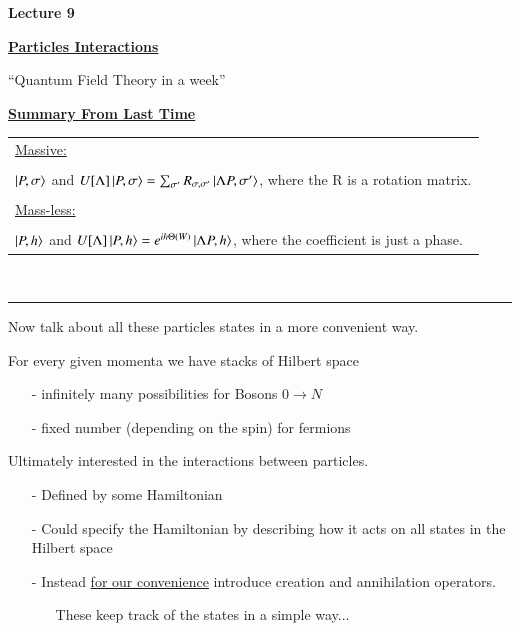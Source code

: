 




\thispagestyle{fancy}

\begin{center}
{\huge \textbf{Lecture 9}}
\end{center}

{\fontsize{14}{16}\selectfont

\textbf{\underline{Particles Interactions}} 

``Quantum Field Theory in a week''

{\Large \underline{\textbf{Summary From Last Time}}}

\begin{tabular}{l}
\underline{Massive:}\\
\\
\hspace{0.5in}$\ket{P, \sigma}$ and $U[\Lambda] \ket{P, \sigma} = \sum_{\sigma'} R_{\sigma,\sigma'} \ket{\Lambda P, \sigma'}$, where the R is a rotation matrix.\\
\\
\underline{Mass-less:}\\
\\
\hspace{0.5in}$\ket{P, h}$ and $U[\Lambda] \ket{P, h} = e^{ih\Theta(W)}\ket{\Lambda P, h}$, where the coefficient is just a phase.\\
\end{tabular}\\

\noindent\rule{\textwidth}{1pt}
Now talk about all these particles states in a more convenient way.  

For every given momenta we have stacks of Hilbert space
\begin{itemize}
\item[-] infinitely many possibilities for Bosons $0\rightarrow N$
\item[-] fixed number (depending on the spin) for fermions
\end{itemize}

\vspace{0.5in}
Ultimately interested in the interactions between particles. 
\begin{itemize}
\item[-] Defined by some Hamiltonian        
\item[-] Could specify the Hamiltonian by describing how it acts on all states in the Hilbert space
\item[-] Instead \underline{for our convenience} introduce creation and annihilation operators.
\begin{itemize}
\item[] These keep track of the states in a simple way...
\end{itemize}
\end{itemize}

}
